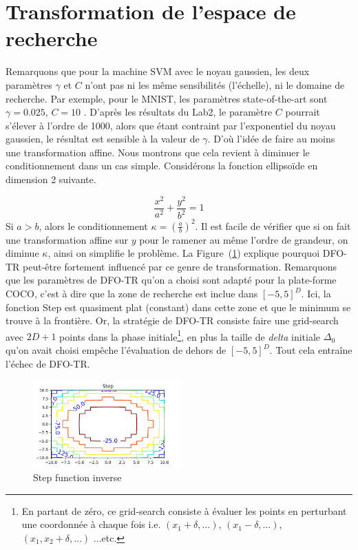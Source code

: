 \documentclass[12 pt, a4paper]{article}
\begin{document}
\section{Transformation de l'espace de recherche}\label{transform}
Remarquons que pour la machine SVM avec le noyau gaussien, les deux paramètres $\gamma$ et $C$ n'ont pas ni les même sensibilités (l'échelle), ni le domaine de recherche. Par exemple, pour le MNIST, les paramètres state-of-the-art sont $\gamma = 0.025$, $C = 10$ \cite{results}. D'après les résultats du Lab2, le paramètre $C$ pourrait s'élever à l'ordre de 1000, alors que étant contraint par l'exponentiel du noyau gaussien, le résultat est sensible à la valeur de $\gamma$. D'où l'idée de faire au moins une transformation affine. Nous montrons que cela revient à diminuer le conditionnement dans un cas simple. Considérons la fonction ellipsoïde en dimension 2 suivante. 

\begin{equation*}
\frac{x^2}{a^2} + \frac{y^2}{b^2} = 1
\end{equation*}
Si $a>b$, alors le conditionnement $\kappa = (\frac{a}{b})^2$. Il est facile de vérifier que si on fait une transformation affine sur $y$ pour le ramener au même l'ordre de grandeur, on diminue $\kappa$, ainsi on simplifie le problème. La Figure~(\ref{fig:step}) explique pourquoi DFO-TR peut-être fortement influencé par ce genre de transformation. Remarquons que les paramètres de DFO-TR qu'on a choisi sont adapté pour la plate-forme COCO, c'est à dire que la zone de recherche est inclue dans $[-5,5]^{D}$. Ici, la fonction Step est quasiment plat (constant) dans cette zone et que le minimum se trouve à la frontière. Or, la stratégie de DFO-TR consiste faire une grid-search avec $2D+1$ points dans la phase initiale\footnote{En partant de zéro, ce grid-search consiste à évaluer les points en perturbant une coordonnée à chaque fois i.e. $(x_{1}+\delta, \ldots)$, $(x_{1}-\delta, \ldots)$, $(x_{1}, x_{2}+\delta, \ldots)$ ...etc.}, en plus la taille de \textit{delta} initiale $\Delta_{0}$ qu'on avait choisi empêche l'évaluation de dehors de $[-5,5]^{D}$. Tout cela entraîne l'échec de DFO-TR.

\begin{figure}[h]
\centering
\includegraphics[width = 0.5\textwidth]{Step_function_inverse.png}
\caption{Step function inverse}
\label{fig:step}
\end{figure}
\end{document}
